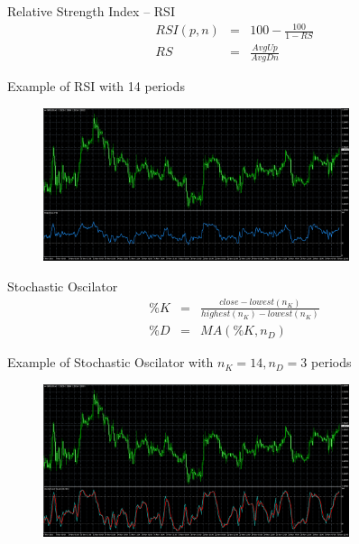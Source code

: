 \documentclass[12pt,portuguese]{beamer}
\begin{document}
\begin{frame}{Relative Strength Index -- RSI}
\begin{equation*}
\begin{array}{rcl}
RSI(p,n) & = & 100 - \frac{100}{1-RS}
\\
RS & = & \frac{AvgUp}{AvgDn}
\end{array}
\end{equation*}

	Example of RSI \citep{WilderJr1978} with 14 periods
	\begin{figure}[H]
	\centering
	\includegraphics[width=0.8\textwidth]{images/mt4_RSI.png}
	\end{figure}
\end{frame}

\begin{frame}{Stochastic Oscilator}
\begin{equation*}
\begin{array}{rcl}
	\%K &=& \frac{close - lowest(n_K)}{highest(n_K) - lowest(n_K)}
\\
	\%D & = & MA(\%K, n_D)
\end{array}
\end{equation*}

	Example of Stochastic Oscilator \citep{Lane1984} with $n_K=14, n_D=3$ periods
	\begin{figure}[H]
	\centering
	\includegraphics[width=0.8\textwidth]{images/mt4_stoch.png}
	\end{figure}
\end{frame}
\end{document}
